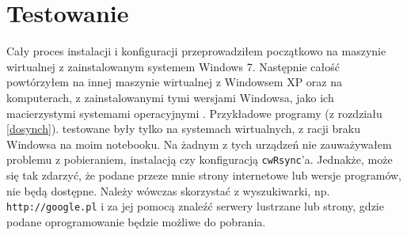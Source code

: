 \section{Testowanie}
Cały proces instalacji i konfiguracji przeprowadziłem początkowo na maszynie wirtualnej z zainstalowanym systemem Windows 7. Następnie całość powtórzyłem na innej maszynie wirtualnej z Windowsem XP oraz na komputerach, z zainstalowanymi tymi wersjami Windowsa, jako ich macierzystymi systemami operacyjnymi . Przykładowe programy (z rozdziału \ref{dosynch}). testowane były tylko na systemach wirtualnych, z racji braku Windowsa na moim notebooku. Na żadnym z tych urządzeń nie zauważywałem problemu z pobieraniem, instalacją czy konfiguracją \verb|cwRsync|'a. Jednakże, może się tak zdarzyć, że podane przeze mnie strony internetowe lub wersje programów, nie będą dostępne. Należy wówczas skorzystać z wyszukiwarki, np. \verb|http://google.pl| i za jej pomocą znaleźć serwery lustrzane lub strony, gdzie podane oprogramowanie będzie możliwe do pobrania. 
